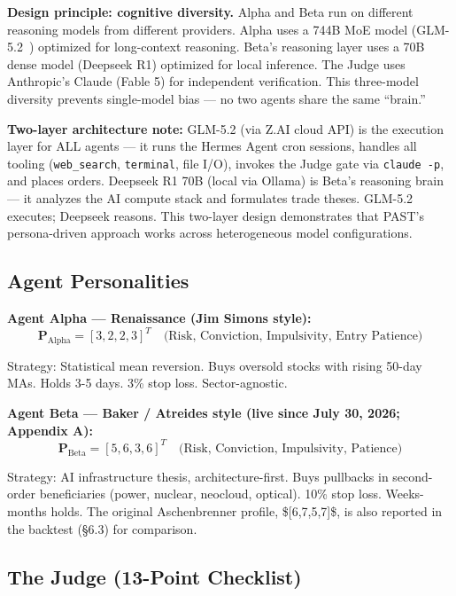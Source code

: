 \documentclass[11pt]{article}
\begin{document}
\textbf{Design principle: cognitive diversity.} Alpha and Beta run on different reasoning models from different providers. Alpha uses a 744B MoE model (GLM-5.2~\citep{glm5}) optimized for long-context reasoning. Beta's reasoning layer uses a 70B dense model (Deepseek R1) optimized for local inference. The Judge uses Anthropic's Claude (Fable 5) for independent verification. This three-model diversity prevents single-model bias --- no two agents share the same ``brain.''

\textbf{Two-layer architecture note:} GLM-5.2 (via Z.AI cloud API) is the execution layer for ALL agents --- it runs the Hermes Agent cron sessions, handles all tooling (\texttt{web\_search}, \texttt{terminal}, file I/O), invokes the Judge gate via \texttt{claude\ -p}, and places orders. Deepseek R1 70B (local via Ollama) is Beta's reasoning brain --- it analyzes the AI compute stack and formulates trade theses. GLM-5.2 executes; Deepseek reasons. This two-layer design demonstrates that PAST's persona-driven approach works across heterogeneous model configurations.

\subsection{Agent Personalities}\label{agent-personalities}

\textbf{Agent Alpha --- Renaissance (Jim Simons style):} \[\mathbf{P}_{\text{Alpha}} = [3, 2, 2, 3]^T \quad \text{(Risk, Conviction, Impulsivity, Entry Patience)}\]

Strategy: Statistical mean reversion. Buys oversold stocks with rising 50-day MAs. Holds 3-5 days. 3\% stop loss. Sector-agnostic.

\textbf{Agent Beta --- Baker / Atreides style (live since July 30, 2026; Appendix A):} \[\mathbf{P}_{\text{Beta}} = [5, 6, 3, 6]^T \quad \text{(Risk, Conviction, Impulsivity, Patience)}\]

Strategy: AI infrastructure thesis, architecture-first. Buys pullbacks in second-order beneficiaries (power, nuclear, neocloud, optical). 10\% stop loss. Weeks-months holds. The original Aschenbrenner profile, \${[}6,7,5,7{]}\$, is also reported in the backtest (§6.3) for comparison.

\subsection{The Judge (13-Point Checklist)}\label{the-judge-13-point-checklist}
\end{document}
